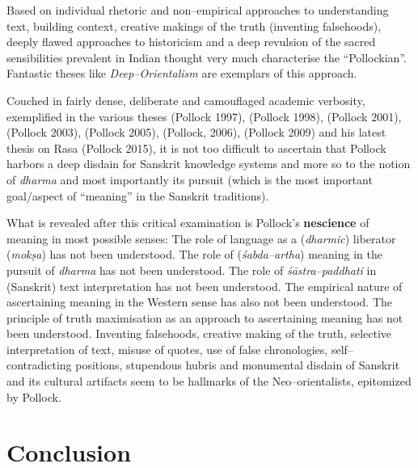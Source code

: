 Based on individual rhetoric and non–empirical approaches to understanding text, building context, creative makings of the truth (inventing falsehoods), deeply flawed approaches to historicism and a deep revulsion of the sacred sensibilities prevalent in Indian thought very much characterise the “Pollockian”. Fantastic theses like \textit{Deep–Orientalism} are exemplars of this approach.

Couched in fairly dense, deliberate and camouflaged academic verbosity, exemplified in the various theses (Pollock 1997), (Pollock 1998), (Pollock 2001),(Pollock 2003), (Pollock 2005), (Pollock, 2006), (Pollock 2009) and his latest thesis on Rasa (Pollock 2015), it is not too difficult to ascertain that Pollock harbors a deep disdain for Sanskrit knowledge systems and more so to the notion of \textit{dharma} and most importantly its pursuit (which is the most important goal/aspect of “meaning” in the Sanskrit traditions).

What is revealed after this critical examination is Pollock’s \textbf{nescience} of meaning in most possible senses: The role of language as a (\textit{dharmic}) liberator (\textit{mokṣa}) has not been understood. The role of (\textit{śabda–artha}) meaning in the pursuit of \textit{dharma} has not been understood. The role of \textit{śāstra–paddhati} in (Sanskrit) text interpretation has not been understood. The empirical nature of ascertaining meaning in the Western sense has also not been understood. The principle of truth maximisation as an approach to ascertaining meaning has not been understood. Inventing falsehoods, creative making of the truth, selective interpretation of text, misuse of quotes, use of false chronologies, self–contradicting positions, stupendous hubris and monumental disdain of Sanskrit and its cultural artifacts seem to be hallmarks of the Neo–orientalists, epitomized by Pollock.


\section*{Conclusion}

